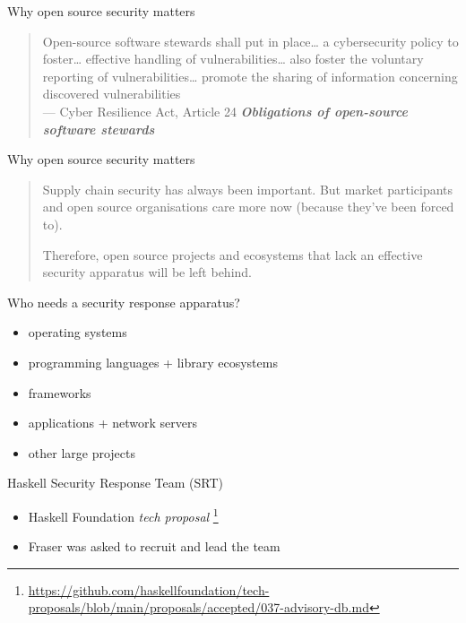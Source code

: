 \documentclass[ignorenonframetext,aspectratio=169,12pt]{beamer}
\begin{document}
\begin{frame}{Why open source security matters}
\begin{quote}
\raggedright
  Open-source software {stewards} shall put in place\ldots{}
  a {cybersecurity policy} to foster\ldots{}
  effective {handling of vulnerabilities}\ldots{}
  also foster the {voluntary reporting} of vulnerabilities\ldots{}
  promote the {sharing of information} concerning discovered vulnerabilities
\\
  {\hfill --- \footnotesize Cyber Resilience Act, Article 24 {\em
  \textbf{Obligations of open-source software stewards}}}
\end{quote}
\end{frame}

\begin{frame}{Why open source security matters}
\large
\begin{quote}
\raggedright
Supply chain security has always been important.  But market
  participants and open source organisations care more now (because
  they've been forced to).

\bigskip

Therefore, open source projects and ecosystems that lack an
effective security apparatus will be left behind.
\end{quote}
\end{frame}

\begin{frame}{Who needs a security response apparatus?}
    \begin{itemize}
        \item operating systems
        \item programming languages + library ecosystems
        \item frameworks
        \item applications + network servers
        \item other large projects
    \end{itemize}
\end{frame}

\begin{frame}{Haskell Security Response Team (SRT)}
  \begin{itemize}
    \item Haskell Foundation {\em tech proposal}
          \footnote{\url{https://github.com/haskellfoundation/tech-proposals/blob/main/proposals/accepted/037-advisory-db.md}}
    \item Fraser was asked to recruit and lead the team
  \end{itemize}
\end{frame}
\end{document}
